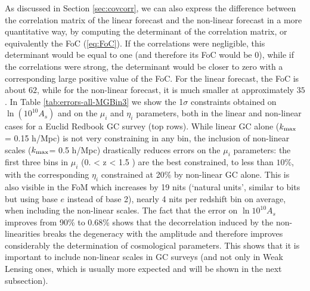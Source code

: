 As discussed in Section \ref{sec:covcorr}, we can also express the difference between the correlation matrix of the linear forecast and the non-linear forecast in a more quantitative way, by computing the
determinant of the correlation matrix, or equivalently the FoC (\ref{eq:FoC}). 
If the correlations were negligible, this determinant would be equal to one (and therefore its FoC would be 0), while if the correlations were strong, the determinant
would be closer to zero with a corresponding large positive value of the FoC.
For the linear forecast, the FoC is about $62$, while for the non-linear forecast, it is much smaller at approximately $35$. 
In Table \ref{tab:errors-all-MGBin3} we show the 1$\sigma$ constraints obtained on $\ln{(10^{10}A_s)}$
and on the $\mu_i$ and $\eta_i$ parameters, both in the linear and 
non-linear cases for a Euclid Redbook GC survey (top rows).
While linear GC alone ($k_{\rm max}$ = 0.15 h/Mpc) is not very constraining in any bin, the inclusion of non-linear scales ($k_{\rm max} $= 0.5 h/Mpc) drastically reduces errors on the $\mu_{i}$ parameters: the first three bins in $\mu_i$ (0. < z < 1.5 ) are the best constrained, to less than $10\%$, with the corresponding $\eta_i$ constrained at 20$\%$ by non-linear GC alone. This is also visible in the FoM which increases by 19 nits (`natural units', similar to bits but using base $e$ instead of base 2), nearly 4 nits per redshift bin on average, when including the non-linear scales. The fact that the error on $\ln10^{10}A_{s}$ improves from 90\% to 0.68\% shows that the decorrelation induced by the non-linearities breaks the degeneracy with the amplitude and therefore improves considerably the determination of cosmological parameters. This shows that it is important to include non-linear scales in GC surveys (and not only in Weak Lensing ones, which is usually more expected and will be shown in the next subsection).

